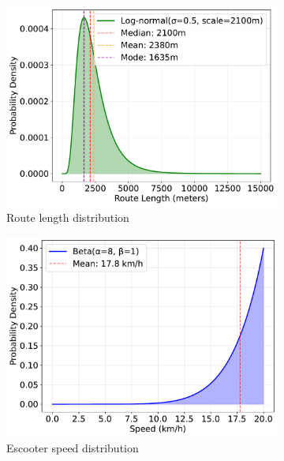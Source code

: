 \begin{figure}
    \begin{subfigure}{0.49\linewidth}
        \centering
        \includegraphics[width=\linewidth]{./fig/route-length-distribution-no-labels.pdf}
        \caption{Route length distribution}
        \label{fig:trip-route-length-distribution}
    \end{subfigure}
    \hfill
    \begin{subfigure}{0.49\linewidth}
        \centering
        \includegraphics[width=\linewidth]{./fig/speed-distribution-no-labels.pdf}
        \caption{Escooter speed distribution}
        \label{fig:trip-speed-distribution}
    \end{subfigure}
    \vfill
    \begin{subfigure}{0.49\linewidth}

\end{subfigure}
\end{figure}
